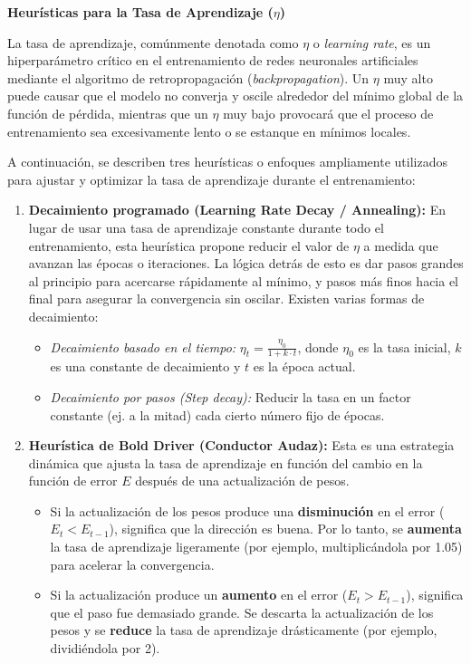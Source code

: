 \textbf{Heurísticas para la Tasa de Aprendizaje ($\eta$)}

La tasa de aprendizaje, comúnmente denotada como $\eta$ o \textit{learning rate}, es un hiperparámetro crítico en el entrenamiento de redes neuronales artificiales mediante el algoritmo de retropropagación (\textit{backpropagation}). Un $\eta$ muy alto puede causar que el modelo no converja y oscile alrededor del mínimo global de la función de pérdida, mientras que un $\eta$ muy bajo provocará que el proceso de entrenamiento sea excesivamente lento o se estanque en mínimos locales. 

A continuación, se describen tres heurísticas o enfoques ampliamente utilizados para ajustar y optimizar la tasa de aprendizaje durante el entrenamiento:

\begin{enumerate}
    \item \textbf{Decaimiento programado (Learning Rate Decay / Annealing):}
    En lugar de usar una tasa de aprendizaje constante durante todo el entrenamiento, esta heurística propone reducir el valor de $\eta$ a medida que avanzan las épocas o iteraciones. La lógica detrás de esto es dar pasos grandes al principio para acercarse rápidamente al mínimo, y pasos más finos hacia el final para asegurar la convergencia sin oscilar.
    Existen varias formas de decaimiento:
    \begin{itemize}
        \item \textit{Decaimiento basado en el tiempo:} $\eta_t = \frac{\eta_0}{1 + k \cdot t}$, donde $\eta_0$ es la tasa inicial, $k$ es una constante de decaimiento y $t$ es la época actual.
        \item \textit{Decaimiento por pasos (Step decay):} Reducir la tasa en un factor constante (ej. a la mitad) cada cierto número fijo de épocas.
    \end{itemize}

    \item \textbf{Heurística de Bold Driver (Conductor Audaz):}
    Esta es una estrategia dinámica que ajusta la tasa de aprendizaje en función del cambio en la función de error $E$ después de una actualización de pesos.
    \begin{itemize}
        \item Si la actualización de los pesos produce una \textbf{disminución} en el error ($E_t < E_{t-1}$), significa que la dirección es buena. Por lo tanto, se \textbf{aumenta} la tasa de aprendizaje ligeramente (por ejemplo, multiplicándola por 1.05) para acelerar la convergencia.
        \item Si la actualización produce un \textbf{aumento} en el error ($E_t > E_{t-1}$), significa que el paso fue demasiado grande. Se descarta la actualización de los pesos y se \textbf{reduce} la tasa de aprendizaje drásticamente (por ejemplo, dividiéndola por 2).
    \end{itemize}


\end{enumerate}
